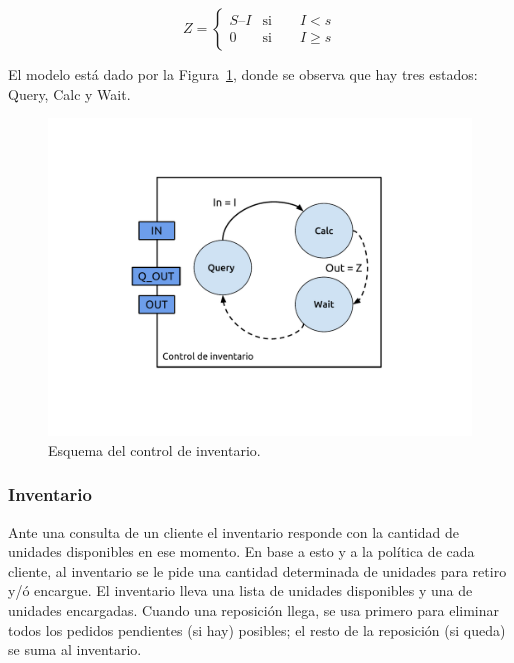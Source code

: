 \documentclass[10pt]{article}
\begin{document}
\begin{equation}
Z=\left\{\begin{array}{lr}
		S – I & \textrm{si}\qquad I < s\\
		0 & \textrm{si} \qquad I \geq s
	\end{array}\right.
\label{eq:ctrlinv}
\end{equation}

El modelo está dado por la Figura~\ref{fig:fig6}, donde se observa que hay tres estados: Query, Calc y Wait.

\begin{figure}
\centering
\includegraphics[scale=1]{img/figura6}
\caption{Esquema del control de inventario.}
\label{fig:fig6}
\end{figure}


\subsubsection{Inventario}

Ante una consulta de un cliente el inventario responde con la cantidad de unidades disponibles en ese momento. En base a esto y a la política de cada cliente, al inventario se le pide una cantidad determinada de unidades para retiro y/ó encargue.
El inventario lleva una lista de unidades disponibles y una de unidades encargadas. Cuando una reposición llega, se usa primero para eliminar todos los pedidos pendientes (si hay) posibles; el resto de la reposición (si queda) se suma al inventario. 
\end{document}
